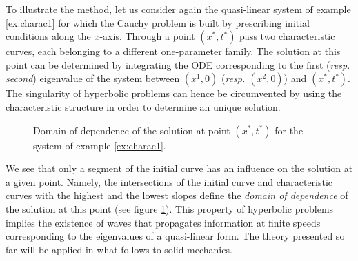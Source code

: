 To illustrate the method, let us consider again the quasi-linear system of example \ref{ex:charac1} for which the Cauchy problem is built by prescribing initial conditions along the $x$-axis. Through a point $(x^*,t^*)$ pass two characteristic curves, each belonging to a different one-parameter family. The solution at this point can be determined by integrating the ODE corresponding to the first (\textit{resp. second}) eigenvalue of the system between $(x^1,0)$ (\textit{resp. $(x^2,0)$}) and $(x^*,t^*)$. The singularity of hyperbolic problems can hence be circumvented by using the characteristic structure in order to determine an unique solution. 
\begin{figure}[h]
  \centering
  
  \caption{Domain of dependence of the solution at point $(x^*,t^*)$ for the system of example \ref{ex:charac1}.}
  \label{fig:charac_method2x2}
\end{figure}
We see that only a segment of the initial curve has an influence on the solution at a given point. Namely, the intersections of the initial curve and characteristic curves with the highest and the lowest slopes define the \textit{domain of dependence} of the solution at this point (see figure \ref{fig:charac_method2x2}). This property of hyperbolic problems implies the existence of waves that propagates information at finite speeds corresponding to the eigenvalues of a quasi-linear form. The theory presented so far will be applied in what follows to solid mechanics.




